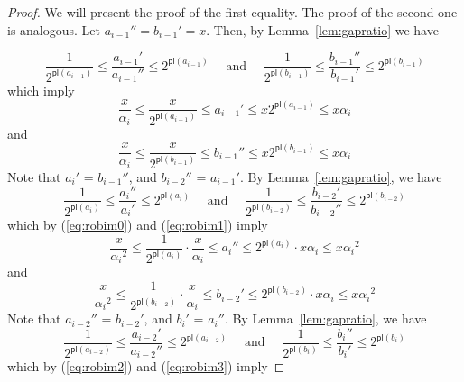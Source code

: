 \documentclass[11pt]{article}
\newcommand{\ens}[1]{\ensuremath{#1}}
\newcommand{\agap}[1]{\ensuremath{a_{#1}}}
\newcommand{\bgap}[1]{\ensuremath{b_{#1}}}
\newcommand{\leftof}[1]{\ensuremath{\gap #1'}}
\newcommand{\rightof}[1]{\ensuremath{\gap #1''}}
\newcommand{\gap}[1]{\ensuremath{#1}}
\newcommand{\potlossa}[1]{\ens{\mathsf{pl}(\agap{#1})}}
\newcommand{\potlossb}[1]{\ens{\mathsf{pl}(\bgap{#1})}}
\newcommand{\maxpotlossa}[1]{\ensuremath{\alpha_{#1}}}
\begin{document}
\begin{proof} 


We will present the proof of the first equality. The proof of the second one is analogous. Let $\rightof{a_{i-1}} = \leftof{b_{i-1}} = x$. Then, by Lemma~\ref{lem:gapratio} we have 

\[ 
\frac{1}{2^{\potlossa{i-1}}} \leq \frac{\leftof{a_{i-1}}}{\rightof{a_{i-1}}} \leq 2^{\potlossa{i-1}} 
\quad \mbox{ and }\quad 
\frac{1}{2^{\potlossb{i-1}}} \leq \frac{\rightof{b_{i-1}}}{\leftof{b_{i-1}}} \leq 2^{\potlossb{i-1}} 
\] 
which imply 
\begin{equation} 
\label{eq:robim0}
\frac{x}{\maxpotlossa i}\leq\frac{x}{2^{\potlossa{i-1}}} \leq \leftof{a_{i-1}} \leq x2^{\potlossa{i-1}} \leq x \maxpotlossa i 
\end{equation} 
and 
\begin{equation} 
\label{eq:robim1} 
\frac{x}{\maxpotlossa i}\leq\frac{x}{2^{\potlossb{i-1}}} \leq \rightof{b_{i-1}} \leq x2^{\potlossb{i-1}} \leq x \maxpotlossa i 
\end{equation} 
Note that \leftof{a_i} = \rightof{b_{i-1}}, and \rightof{b_{i-2}} = \leftof{a_{i-1}}. By Lemma~\ref{lem:gapratio}, we have 
\begin{equation*}
\frac{1}{2^{\potlossa{i}}} \leq \frac{\rightof{a_{i}}}{\leftof{a_{i}}} \leq 2^{\potlossa{i}} 
\quad \mbox{ and }\quad 
\frac{1}{2^{\potlossb{i-2}}} \leq \frac{\leftof{b_{i-2}}}{\rightof{b_{i-2}}} \leq 2^{\potlossb{i-2}} 
\end{equation*}
which by (\ref{eq:robim0}) and (\ref{eq:robim1}) imply 
\begin{equation} 
\label{eq:robim2}
\frac{x}{\maxpotlossa i^2}\leq\frac{1}{2^{\potlossa{i}}}\cdot\frac{x}{\maxpotlossa i}\leq \rightof{a_{i}} \leq 2^{\potlossa{i}} \cdot x\maxpotlossa i  \leq x \maxpotlossa i^2 
\end{equation} 
and 
\begin{equation}
\label{eq:robim3} 
\frac{x}{\maxpotlossa i^2}\leq\frac{1}{2^{\potlossb{i-2}}}\cdot\frac{x}{\maxpotlossa i}\leq \leftof{b_{i-2}} \leq 2^{\potlossb{i-2}} \cdot x\maxpotlossa i  \leq x \maxpotlossa i^2 
\end{equation} 
Note that \rightof{a_{i-2}} = \leftof{b_{i-2}}, and \leftof{b_{i}} = \rightof{a_{i}}. By Lemma~\ref{lem:gapratio}, we have 
\[ 
\frac{1}{2^{\potlossa{i-2}}} \leq \frac{\leftof{a_{i-2}}}{\rightof{a_{i-2}}} \leq 2^{\potlossa{i-2}} 
\quad \mbox{ and }\quad 
\frac{1}{2^{\potlossb{i}}} \leq \frac{\rightof{b_{i}}}{\leftof{b_{i}}} \leq 2^{\potlossb{i}} 
\] 
which by (\ref{eq:robim2}) and (\ref{eq:robim3}) imply 

\end{proof}
\end{document}

